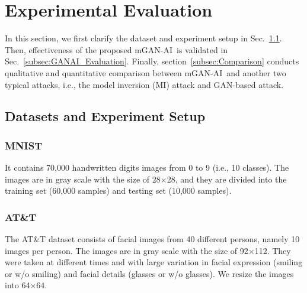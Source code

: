 \documentclass[10pt, conference, letterpaper]{IEEEtran}
\newcommand{\alg}{mGAN-AI}
\newcommand{\zz}[1]{\textcolor{red}{[Zhifei: #1]}}
\begin{document}
\section{Experimental Evaluation}
\label{sec:experiment}
In this section, we first clarify the dataset and experiment setup in Sec.~\ref{subsec:datasets}. Then, effectiveness of the proposed \alg~is validated in Sec.~\ref{subsec:GANAI_Evaluation}. Finally, section~\ref{subsec:Comparison} conducts qualitative and quantitative comparison between \alg~and another two typical attacks, i.e., the model inversion (MI) attack and GAN-based attack.

\subsection{Datasets and Experiment Setup}
\label{subsec:datasets}
\subsubsection{MNIST}
It contains 70,000 handwritten digits images from 0 to 9 (i.e., 10 classes). The images are in gray scale with the size of 28$\times$28, and they are divided into the training set (60,000 samples) and testing set (10,000 samples).

\subsubsection{AT\&T}
The AT\&T dataset consists of facial images from 40 different persons, namely 10 images per person. The images are in gray scale with the size of 92$\times$112. They were taken at different times and with large variation in facial expression (smiling or w/o smiling) and facial details (glasses or w/o glasses). We resize the images into 64$\times$64.

\end{document}
